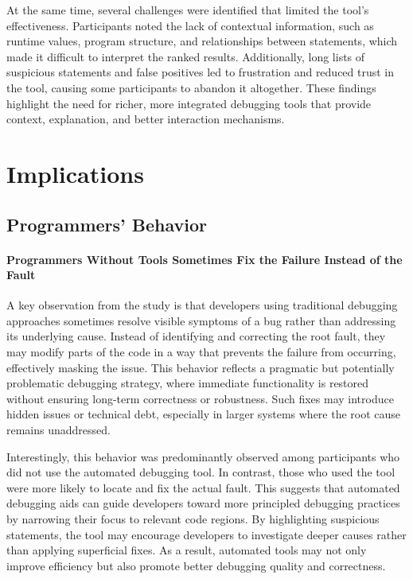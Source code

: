 At the same time, several challenges were identified that limited the tool’s effectiveness. Participants noted the lack of contextual information, such as runtime values, program structure, and relationships between statements, which made it difficult to interpret the ranked results. Additionally, long lists of suspicious statements and false positives led to frustration and reduced trust in the tool, causing some participants to abandon it altogether. These findings highlight the need for richer, more integrated debugging tools that provide context, explanation, and better interaction mechanisms.

\section{Implications}
\subsection{Programmers' Behavior}
\paragraph{Programmers Without Tools Sometimes Fix the Failure Instead of the Fault}

A key observation from the study is that developers using traditional debugging approaches sometimes resolve visible symptoms of a bug rather than addressing its underlying cause. Instead of identifying and correcting the root fault, they may modify parts of the code in a way that prevents the failure from occurring, effectively masking the issue. This behavior reflects a pragmatic but potentially problematic debugging strategy, where immediate functionality is restored without ensuring long-term correctness or robustness. Such fixes may introduce hidden issues or technical debt, especially in larger systems where the root cause remains unaddressed.

Interestingly, this behavior was predominantly observed among participants who did not use the automated debugging tool. In contrast, those who used the tool were more likely to locate and fix the actual fault. This suggests that automated debugging aids can guide developers toward more principled debugging practices by narrowing their focus to relevant code regions. By highlighting suspicious statements, the tool may encourage developers to investigate deeper causes rather than applying superficial fixes. As a result, automated tools may not only improve efficiency but also promote better debugging quality and correctness.

